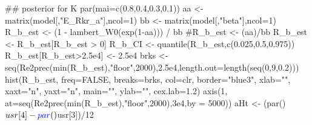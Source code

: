 \documentclass[
  11pt,
]{article}
\newenvironment{Shaded}{}{}
\newcommand{\CommentTok}[1]{\textcolor[rgb]{0.00,0.50,0.00}{#1}}
\newcommand{\DataTypeTok}[1]{#1}
\newcommand{\DecValTok}[1]{#1}
\newcommand{\FloatTok}[1]{#1}
\newcommand{\KeywordTok}[1]{\textcolor[rgb]{0.00,0.00,1.00}{#1}}
\newcommand{\NormalTok}[1]{#1}
\newcommand{\OperatorTok}[1]{#1}
\newcommand{\OtherTok}[1]{\textcolor[rgb]{1.00,0.25,0.00}{#1}}
\newcommand{\StringTok}[1]{\textcolor[rgb]{0.00,0.50,0.50}{#1}}
\begin{document}
\begin{Shaded}
\begin{Highlighting}[]
\CommentTok{## posterior for K}
\KeywordTok{par}\NormalTok{(}\DataTypeTok{mai=}\KeywordTok{c}\NormalTok{(}\FloatTok{0.8}\NormalTok{,}\FloatTok{0.4}\NormalTok{,}\FloatTok{0.3}\NormalTok{,}\FloatTok{0.1}\NormalTok{))}
\NormalTok{aa <-}\StringTok{ }\KeywordTok{matrix}\NormalTok{(model[,}\StringTok{"E_Rkr_a"}\NormalTok{],}\DataTypeTok{ncol=}\DecValTok{1}\NormalTok{)}
\NormalTok{bb <-}\StringTok{ }\KeywordTok{matrix}\NormalTok{(model[,}\StringTok{"beta"}\NormalTok{],}\DataTypeTok{ncol=}\DecValTok{1}\NormalTok{)}
\NormalTok{R_b_est <-}\StringTok{ }\NormalTok{(}\DecValTok{1} \OperatorTok{-}\StringTok{ }\KeywordTok{lambert_W0}\NormalTok{(}\KeywordTok{exp}\NormalTok{(}\DecValTok{1}\OperatorTok{-}\NormalTok{aa))) }\OperatorTok{/}\StringTok{ }\NormalTok{bb}
\CommentTok{#R_b_est <- (aa)/bb}
\NormalTok{R_b_est <-}\StringTok{ }\NormalTok{R_b_est[R_b_est }\OperatorTok{>}\StringTok{ }\DecValTok{0}\NormalTok{]}
\NormalTok{R_b_CI <-}\StringTok{ }\KeywordTok{quantile}\NormalTok{(R_b_est,}\KeywordTok{c}\NormalTok{(}\FloatTok{0.025}\NormalTok{,}\FloatTok{0.5}\NormalTok{,}\FloatTok{0.975}\NormalTok{))}
\NormalTok{R_b_est[R_b_est}\OperatorTok{>}\FloatTok{2.5e4}\NormalTok{] <-}\StringTok{ }\FloatTok{2.5e4}
\NormalTok{brks <-}\StringTok{ }\KeywordTok{seq}\NormalTok{(}\KeywordTok{Re2prec}\NormalTok{(}\KeywordTok{min}\NormalTok{(R_b_est),}\StringTok{"floor"}\NormalTok{,}\DecValTok{2000}\NormalTok{),}\FloatTok{2.5e4}\NormalTok{,}\DataTypeTok{length.out=}\KeywordTok{length}\NormalTok{(}\KeywordTok{seq}\NormalTok{(}\DecValTok{0}\NormalTok{,}\DecValTok{9}\NormalTok{,}\FloatTok{0.2}\NormalTok{)))}
\KeywordTok{hist}\NormalTok{(R_b_est, }\DataTypeTok{freq=}\OtherTok{FALSE}\NormalTok{, }\DataTypeTok{breaks=}\NormalTok{brks, }\DataTypeTok{col=}\NormalTok{clr, }\DataTypeTok{border=}\StringTok{"blue3"}\NormalTok{,}
     \DataTypeTok{xlab=}\StringTok{""}\NormalTok{, }\DataTypeTok{xaxt=}\StringTok{"n"}\NormalTok{, }\DataTypeTok{yaxt=}\StringTok{"n"}\NormalTok{,}
     \DataTypeTok{main=}\StringTok{""}\NormalTok{, }\DataTypeTok{ylab=}\StringTok{""}\NormalTok{, }\DataTypeTok{cex.lab=}\FloatTok{1.2}\NormalTok{)}
\KeywordTok{axis}\NormalTok{(}\DecValTok{1}\NormalTok{, }\DataTypeTok{at=}\KeywordTok{seq}\NormalTok{(}\KeywordTok{Re2prec}\NormalTok{(}\KeywordTok{min}\NormalTok{(R_b_est),}\StringTok{"floor"}\NormalTok{,}\DecValTok{2000}\NormalTok{),}\FloatTok{3e4}\NormalTok{,}\DataTypeTok{by =} \DecValTok{5000}\NormalTok{))}
\NormalTok{aHt <-}\StringTok{ }\NormalTok{(}\KeywordTok{par}\NormalTok{()}\OperatorTok{$}\NormalTok{usr[}\DecValTok{4}\NormalTok{]}\OperatorTok{-}\KeywordTok{par}\NormalTok{()}\OperatorTok{$}\NormalTok{usr[}\DecValTok{3}\NormalTok{])}\OperatorTok{/}\DecValTok{12}

\end{Highlighting}
\end{Shaded}
\end{document}
